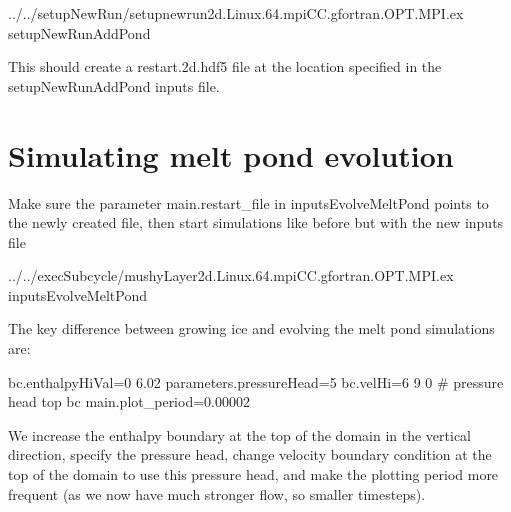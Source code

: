 \begin{DoxyCode}
../../setupNewRun/setupnewrun2d.Linux.64.mpiCC.gfortran.OPT.MPI.ex  setupNewRunAddPond
\end{DoxyCode}


This should create a {\ttfamily restart.\+2d.\+hdf5} file at the location specified in the {\ttfamily setup\+New\+Run\+Add\+Pond} inputs file.

\section*{Simulating melt pond evolution}

Make sure the parameter {\ttfamily main.\+restart\+\_\+file} in {\ttfamily inputs\+Evolve\+Melt\+Pond} points to the newly created file, then start simulations like before but with the new inputs file 
\begin{DoxyCode}
../../execSubcycle/mushyLayer2d.Linux.64.mpiCC.gfortran.OPT.MPI.ex  inputsEvolveMeltPond
\end{DoxyCode}


The key difference between growing ice and evolving the melt pond simulations are\+: 
\begin{DoxyCode}
bc.enthalpyHiVal=0 6.02
parameters.pressureHead=5
bc.velHi=6 9 0 # pressure head top bc
main.plot\_period=0.00002
\end{DoxyCode}
 We increase the enthalpy boundary at the top of the domain in the vertical direction, specify the pressure head, change velocity boundary condition at the top of the domain to use this pressure head, and make the plotting period more frequent (as we now have much stronger flow, so smaller timesteps). 